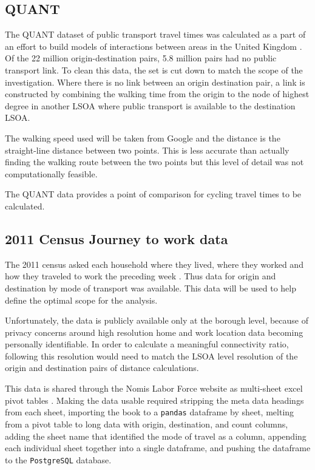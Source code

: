 \subsection{QUANT}

The QUANT dataset of public transport travel times was calculated as a part of an effort to build models of interactions between areas in the United Kingdom \parencite{quant}. Of the 22 million origin-destination pairs, 5.8 million pairs had no public transport link. To clean this data, the set is cut down to match the scope of the investigation. Where there is no link between an origin destination pair, a link is constructed by combining the walking time from the origin to the node of highest degree in another LSOA where public transport is available to the destination LSOA. 

The walking speed used will be taken from Google and the distance is the straight-line distance between two points. This is less accurate than actually finding the walking route between the two points but this level of detail was not computationally feasible. 

The QUANT data provides a point of comparison for cycling travel times to be calculated. 

\subsection{2011 Census Journey to work data}

The 2011 census asked each household where they lived, where they worked and how they traveled to work the preceding week \parencite{jtw}. Thus data for origin and destination by mode of transport was available. This data will be used to help define the optimal scope for the analysis. 

Unfortunately, the data is publicly available only at the borough level, because of privacy concerns around high resolution home and work location data becoming personally identifiable. In order to calculate a meaningful connectivity ratio, following \cite{furth2016network} this resolution would need to match the LSOA level resolution of the origin and destination pairs of distance calculations.  


This data is shared through the Nomis Labor Force website as multi-sheet excel pivot tables \parencite{nomis}. Making the data usable required stripping the meta data headings from each sheet, importing the book to a \texttt{pandas} dataframe by sheet, melting from a pivot table to long data with origin, destination, and count columns, adding the sheet name that identified the mode of travel as a column, appending each individual sheet together into a single dataframe, and pushing the dataframe to the \texttt{PostgreSQL} database. 

